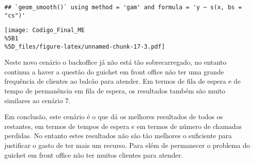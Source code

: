 \documentclass[
]{article}
\begin{document}
\begin{verbatim}
## `geom_smooth()` using method = 'gam' and formula = 'y ~ s(x, bs = "cs")'
\end{verbatim}

\texttt{[image: Codigo\_Final\_ME\\\%5B1\\\%5D\_files/figure-latex/unnamed-chunk-17-3.pdf]}

Neste novo cenário o backoffice já não está tão sobrecarregado, no
entanto continua a haver a questão do guichet em front office não ter
uma grande frequência de clientes ao balcão para atender. Em termos de
fila de espera e de tempo de permanência em fila de espera, os
resultados também são muito similares ao cenário 7.

Em conclusão, este cenário é o que dá os melhores resultados de todos os
restantes, em termos de tempos de espera e em termos de número de
chamadas perdidas. No entanto estes resultados não são tão melhores o
suficiente para justificar o gasto de ter mais um recurso. Para elém de
permanecer o problema do guichet em front office não ter muitos clientes
para atender.
\end{document}
